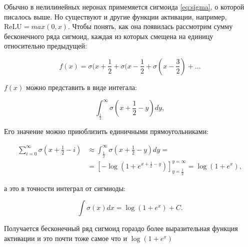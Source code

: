
Обычно в нелилинейных неронах примемяется сигмоида \ref{eq:sigma}, о которой писалось выше. Но существуют и
другие функции активации, например, $\text{ReLU} = max(0, x)$. Чтобы понять, как она появилась рассмотрим
сумму бесконечного ряда сигмоид, каждая из которых смещена на единицу относительно предыдущей:

\begin{equation*}
 f(x) = \sigma(x+\frac{1}{2} + \sigma(x-\frac{1}{2} + \sigma(x-\frac{3}{2}) + \ldots
\end{equation*}

$f(x)$ можно представить в виде интегала:

\begin{equation*}
 \int_\frac{1}{2}^\infty \sigma(x+\frac{1}{2}-y)dy,
\end{equation*}

Его значение можно приюблизить единичными прямоугольниками:

\begin{equation*}
\begin{aligned}
  \sum_{i=0}^\infty \sigma(x+\frac{1}{2}-i) & \approx \int_\frac{1}{2}^\infty \sigma(x+\frac{1}{2}-y)dy = \\
  & = \left[-\log (1+e^{x+\frac{1}{2}-y})\right]^{y=\infty}_{y=\frac{1}{2}} = \log (1+e^x),
\end{aligned}
\end{equation*}

а это в точности интеграл от сигмиоды:

\begin{equation*}
 \int \sigma (x) dx = \log(1+e^x) + C.
\end{equation*}

Получается бесконечный ряд сигмоид гораздо более выразительная функция активации и это почти тоже самое что и
$\log(1+e^x)$



